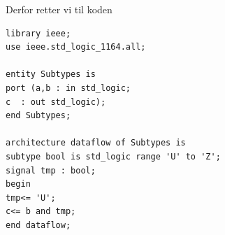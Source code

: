 \begin{enumerate}
	
	Derfor retter vi til koden
	
	\begin{lstlisting}[caption={Rettet subtractor kode},label={lst:SubtractorCode2}]
library ieee;
use ieee.std_logic_1164.all;

entity Subtypes is
port (a,b : in std_logic;
c  : out std_logic);
end Subtypes;

architecture dataflow of Subtypes is
subtype bool is std_logic range 'U' to 'Z';
signal tmp : bool;
begin 
tmp<= 'U';
c<= b and tmp;
end dataflow;
	\end{lstlisting}	

	
\end{enumerate}


